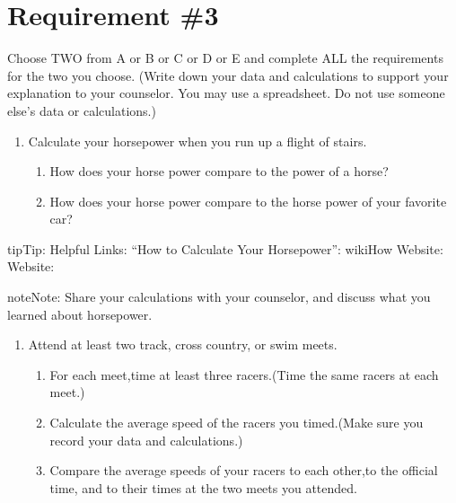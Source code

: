 \documentclass[letterpaper,10pt,english]{sphinxmanual}
\begin{document}
\chapter{Requirement \#3}
\label{\detokenize{requirement3:requirement-3}}\label{\detokenize{requirement3::doc}}
Choose TWO from A or B or C or D or E and complete ALL the requirements for the two you choose. (Write down your data and calculations to support your explanation to your counselor. You may use a spreadsheet. Do not use someone else’s data or calculations.)
\begin{enumerate}
%
\item {} 
Calculate your horsepower when you run up a flight of stairs.
\begin{enumerate}
%
\item {} 
How does your horse power compare to the power of a horse?

\item {} 
How does your horse power compare to the horse power of your favorite car?

\end{enumerate}

\end{enumerate}

\begin{sphinxadmonition}{tip}{Tip:}
Helpful Links: “How to Calculate Your Horsepower”: wikiHow  Website:  Website: 
\end{sphinxadmonition}

\begin{sphinxadmonition}{note}{Note:}
Share your calculations with your counselor, and discuss what you learned about horsepower.
\end{sphinxadmonition}
\begin{enumerate}
%
\setcounter{enumi}{1}
\item {} 
Attend at least two track, cross country, or swim meets.
\begin{enumerate}
%
\item {} 
For each meet,time at least three racers.(Time the same racers at each meet.)

\item {} 
Calculate the average speed of the racers you timed.(Make sure you record your data and calculations.)

\item {} 
Compare the average speeds of your racers to each other,to the official time, and to their times at the two meets you attended.

\end{enumerate}

\end{enumerate}
\end{document}
